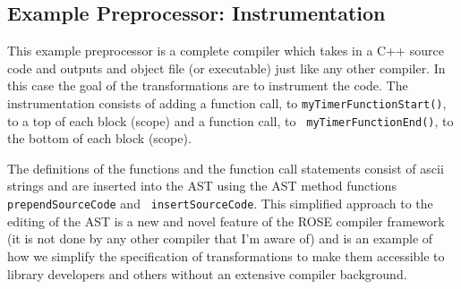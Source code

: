 \documentclass[10pt]{article}
\newcommand{\commentout}[1]{}
\begin{document}
\subsection{Example Preprocessor: Instrumentation}

   This example preprocessor is a complete compiler which takes in a C++ source code and outputs and
object file (or executable) just like any other compiler.  In this case the goal of the
transformations are to instrument the code.  The instrumentation consists of adding a function call,
to {\tt myTimerFunctionStart()}, to a top of each block (scope) and a function call, to {\tt
myTimerFunctionEnd()}, to the bottom of each block (scope).  

\commentout{
In order to be completely
self-contained, and additional transformation inserts the definitions of {\tt
myTimerFunctionStart()} and {\tt myTimerFunctionEnd()} at the top of the program (just before the
{\tt main()} function).
}

   The definitions of the functions and the function call statements consist of ascii strings and
are inserted into the AST using the AST method functions {\tt prependSourceCode} and {\tt
insertSourceCode}.  This simplified approach to the editing of the AST is a new and novel feature of
the ROSE compiler framework (it is not done by any other compiler that I'm aware of) and is an
example of how we simplify the specification of transformations to make them accessible to library
developers and others without an extensive compiler background.

\vspace{0.5in}
\end{document}
